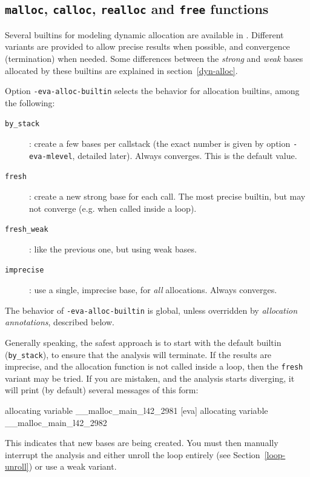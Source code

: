 \documentclass[web]{frama-c-book}
\begin{document}
\subsection{{\tt malloc}, {\tt calloc}, {\tt realloc} and {\tt free} functions}
\label{malloc}

Several builtins for modeling dynamic allocation are available in \FramaC.
Different variants are provided to allow precise results when possible,
and convergence (termination) when needed. Some differences between the
\emph{strong} and \emph{weak} bases allocated by these builtins are
explained in section~\ref{dyn-alloc}.

Option \lstinline|-eva-alloc-builtin| selects the behavior for allocation
builtins, among the following:

\begin{description}
\item[\texttt{by\_stack}]: create a few bases per callstack (the exact number
  is given by option \lstinline|-eva-mlevel|, detailed later).
  Always converges. This is the default value.
\item[\texttt{fresh}]: create a new strong base for each call. The most
  precise builtin, but may not converge (e.g. when called inside a loop).
\item[\texttt{fresh\_weak}]: like the previous one, but using weak bases.
\item[\texttt{imprecise}]: use a single, imprecise base, for {\em all}
  allocations. Always converges.
\end{description}

The behavior of \lstinline|-eva-alloc-builtin| is global, unless overridden by
{\em allocation annotations}, described below.

Generally speaking, the safest approach is to start with the default builtin
(\texttt{by\_stack}), to ensure that the analysis will terminate.
If the results are imprecise, and the allocation function is not called inside
a loop, then the \texttt{fresh} variant may be tried. If you are mistaken, and the
analysis starts diverging, it will print (by default) several messages of this
form:

\begin{listing-nonumber}
[eva] allocating variable __malloc_main_l42_2981
[eva] allocating variable __malloc_main_l42_2982
\end{listing-nonumber}

This indicates that new bases are being created.
You must then manually interrupt the analysis and either unroll the loop
entirely (see Section~\ref{loop-unroll}) or use a weak variant.
\end{document}
